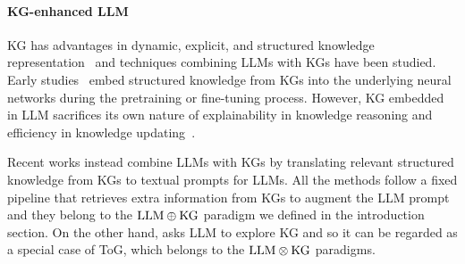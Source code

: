 \documentclass{article} %
\begin{document}
\paragraph{KG-enhanced LLM} KG has advantages in dynamic, explicit, and structured knowledge representation~\citep{pan2023unifying} and techniques combining LLMs with KGs have been studied. Early studies~\citep{Knowbert,huang2024joint, luo2024rog, zhang2021poolingformer, li2023trea, liu2020reasoning} embed structured knowledge from KGs into the underlying neural networks during the pretraining or fine-tuning process. However, KG embedded in LLM sacrifices its own nature of explainability in knowledge reasoning and efficiency in knowledge updating~\citep{KELLMsurvey}.

Recent works instead combine LLMs with KGs by translating relevant structured knowledge from KGs to textual prompts for LLMs. All the methods follow a fixed pipeline that retrieves extra information from KGs to augment the LLM prompt and they belong to the $\hbox{LLM}\oplus \hbox{KG}$ paradigm we defined in the introduction section. On the other hand, \citet{structgpt} asks LLM to explore KG and so it can be regarded as a special case of ToG, which belongs to the $\hbox{LLM}\otimes \hbox{KG}$ paradigms. 

\end{document}
